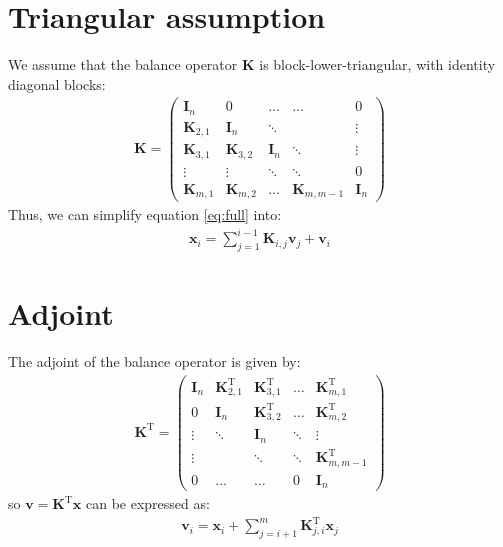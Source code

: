\documentclass[12pt]{scrartcl}
\begin{document}
\section{Triangular assumption}
We assume that the balance operator $\mathbf{K}$ is block-lower-triangular, with identity diagonal blocks:
\begin{align}
\mathbf{K} = \left(\begin{array}{ccccc}
\mathbf{I}_n & 0 & \dots & \dots & 0 \\
\mathbf{K}_{2,1} & \mathbf{I}_n & \ddots & & \vdots \\
\mathbf{K}_{3,1} & \mathbf{K}_{3,2} & \mathbf{I}_n & \ddots & \vdots \\
\vdots & \vdots & \ddots & \ddots & 0 \\
\mathbf{K}_{m,1} & \mathbf{K}_{m,2} & \dots & \mathbf{K}_{m,m-1} & \mathbf{I}_n
\end{array} \right) 
\end{align}
Thus, we can simplify equation \eqref{eq:full} into:
\begin{align}
\label{eq:triangle}
\mathbf{x}_i = \sum_{j=1}^{i-1} \mathbf{K}_{i,j} \mathbf{v}_j + \mathbf{v}_i
\end{align}

\section{Adjoint}
The adjoint of the balance operator is given by: 
\begin{align}
\mathbf{K}^\mathrm{T} = \left(\begin{array}{ccccc}
\mathbf{I}_n & \mathbf{K}^\mathrm{T}_{2,1} & \mathbf{K}^\mathrm{T}_{3,1} & \dots & \mathbf{K}^\mathrm{T}_{m,1} \\
0 & \mathbf{I}_n & \mathbf{K}^\mathrm{T}_{3,2} & \dots & \mathbf{K}^\mathrm{T}_{m,2} \\
\vdots & \ddots & \mathbf{I}_n & \ddots & \vdots \\
\vdots &  & \ddots & \ddots & \mathbf{K}^\mathrm{T}_{m,m-1} \\
0 & \dots & \dots & 0 & \mathbf{I}_n
\end{array} \right) 
\end{align}
so $\mathbf{v} = \mathbf{K}^\mathrm{T} \mathbf{x}$ can be expressed as:
\begin{align}
\label{eq:triangle_ad}
\mathbf{v}_i = \mathbf{x}_i + \sum_{j=i+1}^{m} \mathbf{K}^\mathrm{T}_{j,i} \mathbf{x}_j
\end{align}
\end{document}
